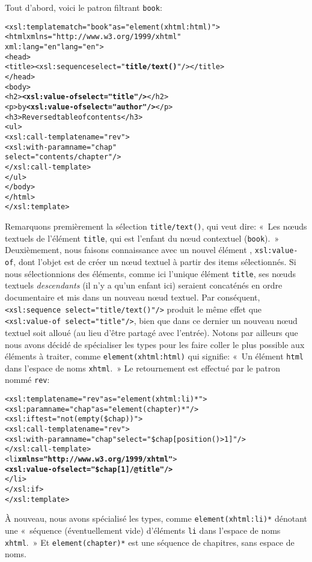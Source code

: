\noindent Tout d'abord, voici le patron filtrant \texttt{book}:
\begin{alltt}
\small  <xsl:template match="book" as="element(xhtml:html)">
    <html xmlns="http://www.w3.org/1999/xhtml"
          xml:lang="en" lang="en">
      <head>
        <title><xsl:sequence select="\textbf{title/text()}"/></title>
      </head>
      <body>
        <h2>\textbf{<xsl:value-of select="title"/>}</h2>
        <p>by \textbf{<xsl:value-of select="author"/>}</p>
        <h3>Reversed table of contents</h3>
        <ul>
          <xsl:call-template name="rev">
            <xsl:with-param name="chap"
                            select="contents/chapter"/>
          </xsl:call-template>
        </ul>
      </body>
    </html>
  </xsl:template>
\end{alltt}
Remarquons premièrement la sélection \texttt{title/text()}, qui veut
dire: «~Les nœuds textuels de l'élément \texttt{title}, qui est
l'enfant du nœud contextuel (\texttt{book}).~» Deuxièmement, nous
faisons connaissance avec un nouvel élément \XSLT,
\texttt{xsl:value-of}, dont l'objet est de créer un nœud textuel à
partir des items sélectionnés. Si nous sélectionnions des éléments,
comme ici l'unique élément \texttt{title}, ses nœuds textuels
\emph{descendants} (il n'y a qu'un enfant ici) seraient concaténés en
ordre documentaire et mis dans un nouveau nœud textuel. Par
conséquent, \texttt{<xsl:sequence select="title/text()"/>} produit le
même effet que \texttt{<xsl:value-of select="title"/>}, bien que dans
ce dernier un nouveau nœud textuel soit alloué (au lieu d'être
partagé avec l'entrée). Notons par ailleurs que nous avons décidé de
spécialiser les types pour les faire coller le plus possible aux
éléments à traiter, comme \texttt{element(xhtml:html)} qui signifie:
«~Un élément \texttt{html} dans l'espace de noms \texttt{xhtml}.~» Le
retournement est effectué par le patron nommé \texttt{rev}:
\begin{alltt}
\small  <xsl:template name="rev" as="element(xhtml:li)*">
    <xsl:param name="chap" as="element(chapter)*"/>
    <xsl:if test="not(empty(\$chap))">
      <xsl:call-template name="rev">
        <xsl:with-param name="chap"\!\! select="\$chap[position()>1]"/>
      </xsl:call-template>
      <li \textbf{xmlns="http://www.w3.org/1999/xhtml"}>
        \textbf{<xsl:value-of select="\$chap[1]/@title"/>}
      </li>
    </xsl:if>
  </xsl:template>
\end{alltt}
À nouveau, nous avons spécialisé les types, comme
\texttt{element(xhtml:li)*} dénotant une «~séquence (éventuellement
vide) d'éléments \texttt{li} dans l'espace de noms \texttt{xhtml}.~» Et
\texttt{element(chapter)*} est une séquence de chapitres, sans espace
de noms.

